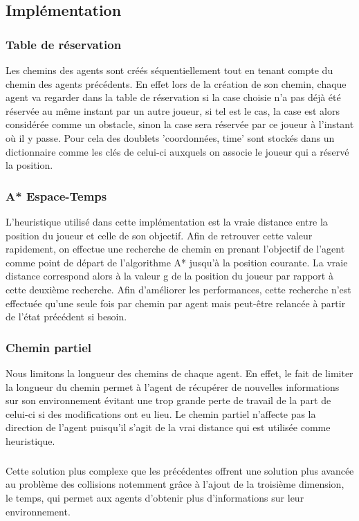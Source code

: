 \documentclass[a4paper, twocolumn]{article}
\begin{document}
			\subsection{Implémentation}
			
			\subsubsection{Table de réservation}
			Les chemins des agents sont créés séquentiellement tout en tenant compte du chemin des agents précédents. En effet lors de la création de son chemin, chaque agent va regarder dans la table de réservation si la case choisie n'a pas déjà été réservée au même instant par un autre joueur, si tel est le cas, la case est alors considérée comme un obstacle, sinon la case sera réservée par ce joueur à l'instant où il y passe. Pour cela des doublets 'coordonnées, time' sont stockés dans un dictionnaire comme les clés de celui-ci auxquels on associe le joueur qui a réservé la position.
		
			
			\subsubsection{A* Espace-Temps}
			L'heuristique utilisé dans cette implémentation est la vraie distance entre la position du joueur et celle de son objectif. Afin de retrouver cette valeur rapidement, on effectue une recherche de chemin en prenant l'objectif de l'agent comme point de départ de l'algorithme A* jusqu'à la position courante. La vraie distance correspond alors à la valeur g de la position du joueur par rapport à cette deuxième recherche. Afin d'améliorer les performances, cette recherche n'est effectuée qu'une seule fois par chemin par agent mais peut-être relancée à partir de l'état précédent si besoin.

			\subsubsection{Chemin partiel}
			Nous limitons la longueur des chemins de chaque agent. En effet, le fait de limiter la longueur du chemin permet à l'agent de récupérer de nouvelles informations sur son environnement évitant une trop grande perte de travail de la part de celui-ci si des modifications ont eu lieu.
			Le chemin partiel n'affecte pas la direction de l'agent puisqu'il s'agit de la vrai distance qui est utilisée comme heuristique.

			\subparagraph{}
			Cette solution plus complexe que les précédentes offrent une solution plus avancée au problème des collisions notemment grâce à l'ajout de la troisième dimension, le temps, qui permet aux agents d'obtenir plus d'informations sur leur environnement.
\end{document}
